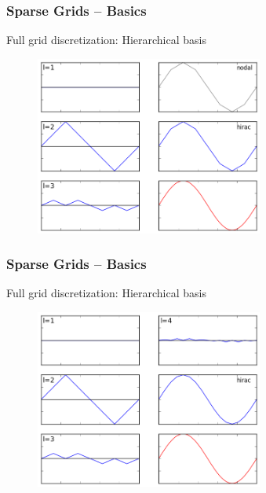 \begin{frame}
  \frametitle{Sparse Grids -- Basics}
  \topline
  \vspace{-10px}
  \begin{block}{Full grid discretization: Hierarchical basis}
    \begin{figure}[!htp]
      \centering
      \includegraphics[width=7.5cm]{images/sparsegrid_1d_1}
      \vspace{-12px}
      \caption{}
    \end{figure}
  \end{block}
\end{frame}


\begin{frame}
  \frametitle{Sparse Grids -- Basics}
  \topline
  \vspace{-10px}
  \begin{block}{Full grid discretization: Hierarchical basis}
    \begin{figure}[!htp]
      \centering
      \includegraphics[width=7.5cm]{images/sparsegrid_1d_2}
      \vspace{-12px}
      \caption{}
    \end{figure}
  \end{block}
\end{frame}

